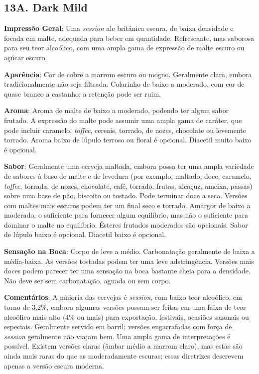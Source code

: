 \subsection*{13A. Dark Mild}
\textbf{Impressão Geral}: Uma \textit{session} ale britânica escura, de baixa densidade e focada em malte, adequada para beber em quantidade. Refrescante, mas saborosa para seu teor alcoólico, com uma ampla gama de expressão de malte escuro ou açúcar escuro.

\textbf{Aparência}: Cor de cobre a marrom escuro ou mogno. Geralmente clara, embora tradicionalmente não seja filtrada. Colarinho de baixo a moderado, com cor de quase branco a castanho; a retenção pode ser ruim.

\textbf{Aroma}: Aroma de malte de baixo a moderado, podendo ter algum sabor frutado. A expressão do malte pode assumir uma ampla gama de caráter, que pode incluir caramelo, \textit{toffee}, cereais, torrado, de nozes, chocolate ou levemente torrado. Aroma baixo de lúpulo terroso ou floral é opcional. Diacetil muito baixo é opcional.

\textbf{Sabor}: Geralmente uma cerveja maltada, embora possa ter uma ampla variedade de sabores à base de malte e de levedura (por exemplo, maltado, doce, caramelo, \textit{toffee}, torrada, de nozes, chocolate, café, torrado, frutas, alcaçuz, ameixa, passas) sobre uma base de pão, biscoito ou tostado. Pode terminar doce a seca. Versões com maltes mais escuros podem ter um final seco e torrado. Amargor de baixo a moderado, o suficiente para fornecer algum equilíbrio, mas não o suficiente para dominar o malte no equilíbrio. Ésteres frutados moderados são opcionais. Sabor de lúpulo baixo é opcional. Diacetil baixo é opcional.

\textbf{Sensação na Boca}: Corpo de leve a médio. Carbonatação geralmente de baixa a média-baixa. As versões tostadas podem ter uma leve adstringência. Versões mais doces podem parecer ter uma sensação na boca bastante cheia para a densidade. Não deve ser sem carbonatação, aguada ou sem corpo.

\textbf{Comentários}: A maioria das cervejas é \textit{session}, com baixo teor alcoólico, em torno de 3,2\%, embora algumas versões possam ser feitas em uma faixa de teor alcoólico mais alto (4\% ou mais) para exportação, festivais, ocasiões sazonais ou especiais. Geralmente servido em barril; versões engarrafadas com força de \textit{session} geralmente não viajam bem. Uma ampla gama de interpretações é possível. Existem versões claras (âmbar médio a marrom claro), mas estas são ainda mais raras do que as moderadamente escuras; essas diretrizes descrevem apenas a versão escura moderna.

